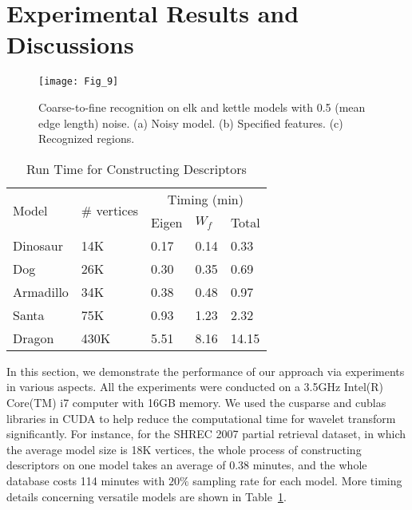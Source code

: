 \section{Experimental Results and Discussions}
\label{sec:Exp}

\begin{figure}[!to]
\texttt{[image: Fig\_9]}
\caption[Coarse-to-fine recognition on elk and kettle models.]
  {Coarse-to-fine recognition on elk and kettle models with 0.5
  (mean edge length) noise. (a) Noisy model. (b) Specified features.
  (c) Recognized regions.}
\label{noise}
\end{figure}

\begin{table}
\centering
\caption{Run Time for Constructing Descriptors}
  \label{table:time}
  \renewcommand{\arraystretch}{1.3}
\begin{tabular}{p{}p{}p{}p{}p{}}
\hline
\multirow{2}{*}{Model} &
\multirow{2}{*}{\# vertices} &
\multicolumn{3}{c}{Timing (min)} \\
\cline{3-5}
&\multicolumn{1}{c}{} & Eigen &  $W_f$ & Total\\
\hline
Dinosaur   & 14K & 0.17 & 0.14 & 0.33 \\
Dog       & 26K & 0.30 & 0.35 & 0.69 \\
Armadillo & 34K & 0.38 & 0.48 & 0.97 \\
Santa     & 75K & 0.93 & 1.23 & 2.32\\
Dragon & 430K & 5.51 & 8.16 & 14.15\\
\hline
\end{tabular}
\end{table}

In this section, we demonstrate the performance of our approach via
experiments in various aspects. All the experiments were conducted on
a 3.5GHz Intel(R) Core(TM) i7 computer with 16GB memory. We used the
cusparse and cublas libraries in CUDA to help reduce the computational
time for wavelet transform significantly. For instance, for the SHREC
2007 partial retrieval dataset, in which the average model size is 18K
vertices, the whole process of constructing descriptors on one model
takes an average of 0.38 minutes, and the whole database costs 114
minutes with $20\%$ sampling rate for each model. More timing details
concerning versatile models are shown in Table~\ref{table:time}.


